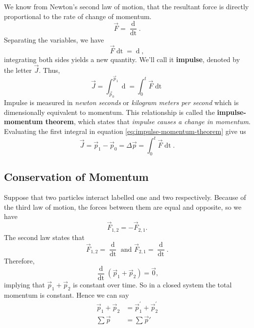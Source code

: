 We know from Newton's second law of motion, that the resultant force is directly proportional to the rate of change of momentum. 
\begin{equation*}
    \vec{F} = \frac{\mathop{\mathrm{d}\vec{p}}}{\mathop{\mathrm{d}t}}.
\end{equation*}
Separating the variables, we have
\begin{equation*}
    \vec{F} \mathop{\mathrm{d}t} = \mathop{\mathrm{d}\vec{p}},
\end{equation*}
integrating both sides yields a new quantity. We'll call it \textbf{impulse}, denoted by the letter $\vec{J}$. Thus,
\begin{equation}
    \label{eq:impulse-momentum-theorem}
    \vec{J} = \int_{\vec{p}_0}^{\vec{p}_1} \mathop{\mathrm{d}\vec{p}} = \int_0^t \vec{F} \mathop{\mathrm{d}t}
\end{equation}
Impulse is measured in \textit{newton seconds} or \textit{kilogram meters per second} which is dimensionally equivalent to momentum. This relationship is called the \textbf{impulse-momentum theorem}, which states that \textit{impulse causes a change in momentum}. Evaluating the first integral in equation \ref{eq:impulse-momentum-theorem} give us
\begin{equation}
    \vec{J} = \vec{p}_1 - \vec{p}_0 = \Delta \vec{p} = \int_0^t \vec{F} \mathop{\mathrm{d}t}.
\end{equation}

\subsection{Conservation of Momentum}

Suppose that two particles interact labelled one and two respectively. Because of the third law of motion, the forces between them are equal and opposite, so we have
\begin{equation}
    \vec{F}_{1,2} = - \vec{F}_{2,1}.
\end{equation}
The second law states that
\begin{equation}
    \vec{F}_{1,2} = \frac{\mathop{\mathrm{d}\vec{p}_1}}{\mathop{\mathrm{d}t}} \text{ and } \vec{F}_{2,1} = \frac{\mathop{\mathrm{d}\vec{p}_2}}{\mathop{\mathrm{d}t}}.
\end{equation}
Therefore,
\begin{equation}
    \frac{\mathop{\mathrm{d}}}{\mathop{\mathrm{d}t}} (\vec{p}_1 + \vec{p}_2) = \vec{0},
\end{equation}
implying that $\vec{p}_1 + \vec{p}_2$ is constant over time. So in a closed system the total momentum is constant. Hence we can say
\begin{align}
    \vec{p}_1 + \vec{p}_2 &= \vec{p}_1^{'} + \vec{p}_2^{'} \\
    \sum \vec{p} &= \sum \vec{p}'
\end{align}

